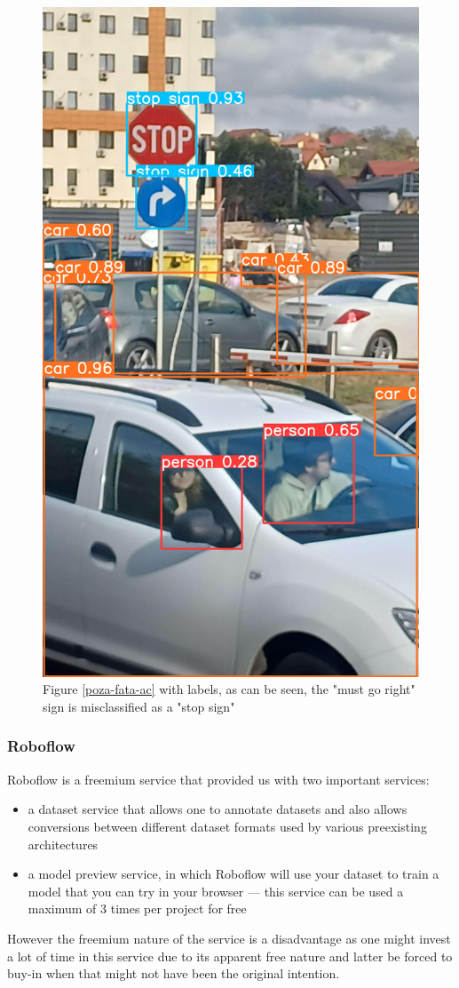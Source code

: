 \documentclass[conference]{IEEEtran}
\begin{document}
\begin{figure}
    \centerline{\includegraphics[width=0.5\linewidth]{poza-fata-ac-results}}
    \caption{Figure \ref{poza-fata-ac} with labels, as can be seen, the "must go right" sign is
    misclassified as a "stop sign"}
\end{figure}

\subsubsection{Roboflow}

Roboflow is a freemium service that provided us with two important services:
\begin{itemize}
    \item a dataset service that allows one to annotate datasets and also allows conversions
     between different dataset formats used by various preexisting architectures
    \item a model preview service, in which Roboflow will use your dataset to train a model that
    you can try in your browser --- this service can be used a maximum of 3 times per project for free
\end{itemize}

However the freemium nature of the service is a disadvantage as one might invest a lot of time in
this service due to its apparent free nature and latter be forced to buy-in when that might not have
been the original intention.
\end{document}
